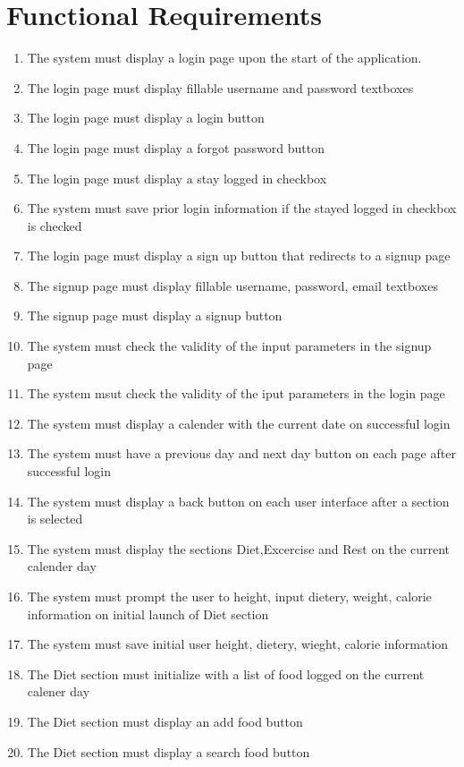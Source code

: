\documentclass[12pt,letterpaper]{article}
\begin{document}
\section{Functional Requirements}
\begin{enumerate}[{FR}1.]
\item  The system must display a login page upon the start of the application.
\item  The login page must display fillable username and password  textboxes
\item  The login page must display a login button
\item  The login page must display a forgot password button
\item  The login page must display a stay logged in checkbox
\item  The system must save prior login information if the stayed logged in checkbox is checked
\item  The login page must display a sign up button that redirects to a signup page
\item  The signup page must display fillable username, password, email textboxes
\item  The signup page must display a signup button
\item  The system must check the validity of the input parameters in the signup page
\item  The system msut check the validity of the iput parameters in the login page
\item  The system must display a calender with the current date on successful login
\item  The system must have a previous day and next day button on each page after successful login
\item  The system must display a back button on each user interface after a section is selected
\item  The system must display the sections Diet,Excercise and Rest on the current calender day
\item  The system must prompt the user to height, input dietery, weight,  calorie information on initial launch of Diet section
\item  The system must save initial user height, dietery, wieght, calorie information
\item  The Diet section must initialize with a list of food logged on the current calener day
\item  The Diet section must display an add food button
\item  The Diet section must display a search food button

\end{enumerate}
\end{document}
